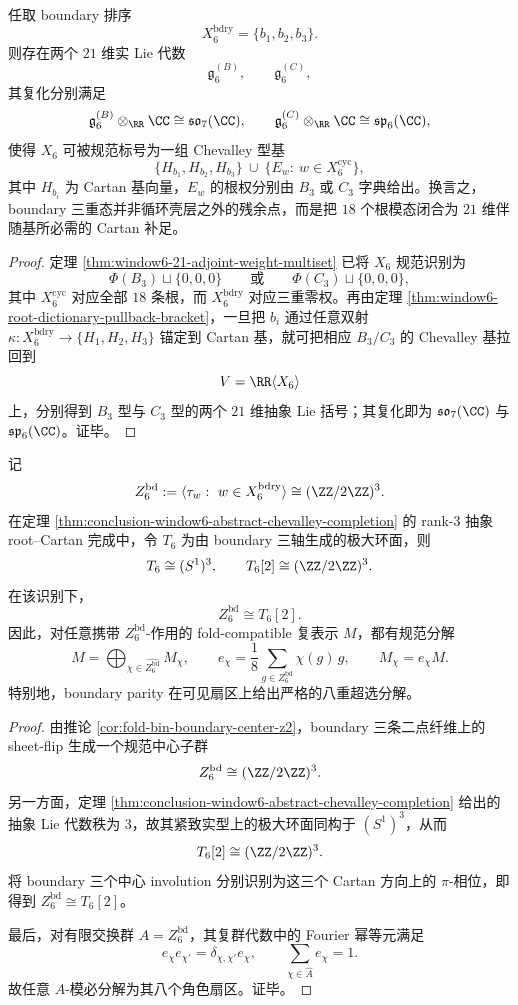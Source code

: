 \begin{theorem}\label{thm:conclusion-window6-abstract-chevalley-completion}
任取 boundary 排序
\[
X_6^{\mathrm{bdry}}=\{b_1,b_2,b_3\}.
\]
则存在两个 \(21\) 维实 Lie 代数
\[
\mathfrak g_6^{(B)},\qquad \mathfrak g_6^{(C)},
\]
其复化分别满足
\[
\mathfrak g_6^{(B)}\otimes_{\RR}\CC\cong \mathfrak{so}_7(\CC),
\qquad
\mathfrak g_6^{(C)}\otimes_{\RR}\CC\cong \mathfrak{sp}_6(\CC),
\]
使得 \(X_6\) 可被规范标号为一组 Chevalley 型基
\[
\{H_{b_1},H_{b_2},H_{b_3}\}\ \cup\ \{E_w:\ w\in X_6^{\mathrm{cyc}}\},
\]
其中 \(H_{b_i}\) 为 Cartan 基向量，\(E_w\) 的根权分别由 \(B_3\) 或 \(C_3\) 字典给出。换言之，boundary 三重态并非循环壳层之外的残余点，而是把 \(18\) 个根模态闭合为 \(21\) 维伴随基所必需的 Cartan 补足。
\end{theorem}
\begin{proof}
定理 \ref{thm:window6-21-adjoint-weight-multiset} 已将 \(X_6\) 规范识别为
\[
\Phi(B_3)\sqcup\{0,0,0\}
\qquad\text{或}\qquad
\Phi(C_3)\sqcup\{0,0,0\},
\]
其中 \(X_6^{\mathrm{cyc}}\) 对应全部 \(18\) 条根，而 \(X_6^{\mathrm{bdry}}\) 对应三重零权。再由定理 \ref{thm:window6-root-dictionary-pullback-bracket}，一旦把 \(b_i\) 通过任意双射 \(\kappa:X_6^{\mathrm{bdry}}\to\{H_1,H_2,H_3\}\) 锚定到 Cartan 基，就可把相应 \(B_3/C_3\) 的 Chevalley 基拉回到
\[
V=\RR\langle X_6\rangle
\]
上，分别得到 \(B_3\) 型与 \(C_3\) 型的两个 \(21\) 维抽象 Lie 括号；其复化即为 \(\mathfrak{so}_7(\CC)\) 与 \(\mathfrak{sp}_6(\CC)\)。证毕。
\end{proof}

\begin{theorem}\label{thm:conclusion-window6-boundary-torus-2torsion}
记
\[
Z_6^{\mathrm{bd}}
:=
\langle \tau_w:\ w\in X_6^{\mathrm{bdry}}\rangle
\cong (\ZZ/2\ZZ)^3.
\]
在定理 \ref{thm:conclusion-window6-abstract-chevalley-completion} 的 rank-\(3\) 抽象 root--Cartan 完成中，令 \(T_6\) 为由 boundary 三轴生成的极大环面，则
\[
T_6\cong (S^1)^3,
\qquad
T_6[2]\cong (\ZZ/2\ZZ)^3.
\]
在该识别下，
\[
Z_6^{\mathrm{bd}}\cong T_6[2].
\]
因此，对任意携带 \(Z_6^{\mathrm{bd}}\)-作用的 fold-compatible 复表示 \(M\)，都有规范分解
\[
M=\bigoplus_{\chi\in \widehat{Z_6^{\mathrm{bd}}}} M_\chi,
\qquad
e_\chi=\frac{1}{8}\sum_{g\in Z_6^{\mathrm{bd}}}\chi(g)\,g,
\qquad
M_\chi=e_\chi M.
\]
特别地，boundary parity 在可见扇区上给出严格的八重超选分解。
\end{theorem}
\begin{proof}
由推论 \ref{cor:fold-bin-boundary-center-z2}，boundary 三条二点纤维上的 sheet-flip 生成一个规范中心子群
\[
Z_6^{\mathrm{bd}}\cong (\ZZ/2\ZZ)^3.
\]
另一方面，定理 \ref{thm:conclusion-window6-abstract-chevalley-completion} 给出的抽象 Lie 代数秩为 \(3\)，故其紧致实型上的极大环面同构于 \((S^1)^3\)，从而
\[
T_6[2]\cong (\ZZ/2\ZZ)^3.
\]
将 boundary 三个中心 involution 分别识别为这三个 Cartan 方向上的 \(\pi\)-相位，即得到 \(Z_6^{\mathrm{bd}}\cong T_6[2]\)。

最后，对有限交换群 \(A=Z_6^{\mathrm{bd}}\)，其复群代数中的 Fourier 幂等元满足
\[
e_\chi e_{\chi'}=\delta_{\chi,\chi'}e_\chi,
\qquad
\sum_{\chi\in \widehat A}e_\chi=1.
\]
故任意 \(A\)-模必分解为其八个角色扇区。证毕。
\end{proof}

